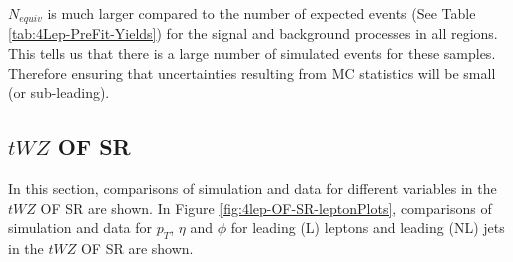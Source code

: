 \begin{table}[h!]	
\centering
\caption{The number of equivalent events, $N_{equiv}$, is shown for each sample in each region.}
\label{tab:N-equiv}
\end{table}$N_{equiv}$ is much larger compared to the number of expected events (See Table \ref{tab:4Lep-PreFit-Yields}) for the signal and background processes in all regions. This tells us that there is a large number of simulated events for these samples. Therefore ensuring that uncertainties resulting from MC statistics will be small (or sub-leading).

\subsection{$tWZ$ OF SR}
\label{sec:controlplotstetralepton-tWZ-OF-SR}


In this section, comparisons of simulation and data for different variables in the $tWZ$ OF SR are shown. In Figure \ref{fig:4lep-OF-SR-leptonPlots}, comparisons of simulation and data for $p_{T}$, $\eta$ and $\phi$ for leading (L) leptons and leading (NL) jets in the $tWZ$ OF SR are shown.

